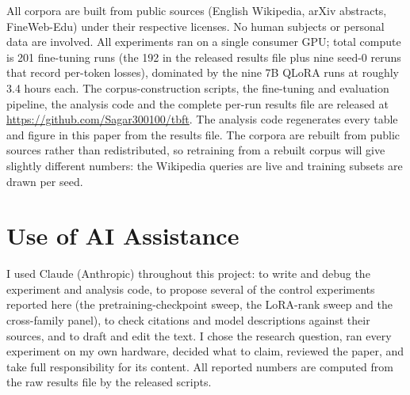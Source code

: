 \documentclass[11pt]{article}
\begin{document}
All corpora are built from public sources (English Wikipedia, arXiv
abstracts, FineWeb-Edu) under their respective licenses. No human subjects
or personal data are involved. All experiments ran on a single consumer GPU;
total compute is 201 fine-tuning runs (the 192 in the released results file
plus nine seed-0 reruns that record per-token losses), dominated by the nine
7B QLoRA runs at roughly 3.4 hours each. The corpus-construction scripts,
the fine-tuning and evaluation pipeline, the analysis code and the complete
per-run results file are released at
\url{https://github.com/Sagar300100/tbft}. The analysis code regenerates
every table and figure in this paper from the results file. The corpora are
rebuilt from public sources rather than redistributed, so retraining from a
rebuilt corpus will give slightly different numbers: the Wikipedia queries
are live and training subsets are drawn per seed.

\section*{Use of AI Assistance}

I used Claude (Anthropic) throughout this project: to write and debug the
experiment and analysis code, to propose several of the control experiments
reported here (the pretraining-checkpoint sweep, the LoRA-rank sweep and the
cross-family panel), to check citations and model descriptions against their
sources, and to draft and edit the text. I chose the research question, ran
every experiment on my own hardware, decided what to claim, reviewed the
paper, and take full responsibility for its content. All reported numbers are
computed from the raw results file by the released scripts.



\end{document}
